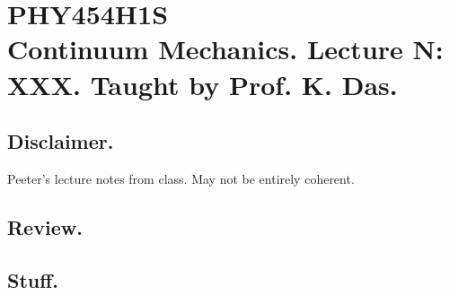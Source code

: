
%

\chapter{PHY454H1S\\Continuum Mechanics.  Lecture {N}: XXX.  Taught by Prof. K. Das.}
\label{chap:continuumL{N}}
{}
\date{Feb XX, 2012}

\beginArtWithToc

\section{Disclaimer.}

Peeter's lecture notes from class.  May not be entirely coherent.

\section{Review.}

\section{Stuff.}


\EndArticle
